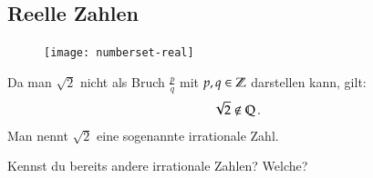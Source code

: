 \subsection{Reelle Zahlen}
\begin{figure}
	\vspace{-1cm}
	\texttt{[image: numberset-real]}
	\vspace{-1cm}
\end{figure}
Da man $\sqrt{2}$ nicht als Bruch $\frac{p}{q}$ mit $p,q\in\mathbb{Z}$ darstellen kann, gilt:
\begin{align*}
  \sqrt{2} \notin \mathbb{Q}\, .
\end{align*}
Man nennt $\sqrt{2}$ eine sogenannte irrationale Zahl.
\begin{example}
 Kennst du bereits andere irrationale Zahlen? Welche?\\
\end{example}

